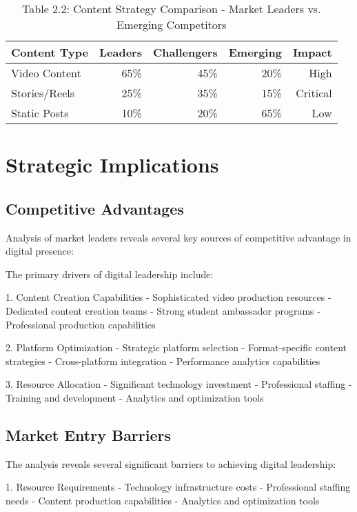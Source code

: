 \documentclass[12pt]{report}
\begin{document}
\begin{table}[h]
\centering
\caption{Table 2.2: Content Strategy Comparison - Market Leaders vs. Emerging Competitors}
\begin{tabular}{@{}lrrrr@{}}
\toprule
\textbf{Content Type} & \textbf{Leaders} & \textbf{Challengers} & \textbf{Emerging} & \textbf{Impact} \\
\midrule
Video Content & 65\% & 45\% & 20\% & High \\
Stories/Reels & 25\% & 35\% & 15\% & Critical \\
Static Posts & 10\% & 20\% & 65\% & Low \\
\bottomrule
\end{tabular}
\end{table}

\chapter{Strategic Implications}

\section{Competitive Advantages}

Analysis of market leaders reveals several key sources of competitive advantage in digital presence:

The primary drivers of digital leadership include:

1. Content Creation Capabilities
   - Sophisticated video production resources
   - Dedicated content creation teams
   - Strong student ambassador programs
   - Professional production capabilities

2. Platform Optimization
   - Strategic platform selection
   - Format-specific content strategies
   - Cross-platform integration
   - Performance analytics capabilities

3. Resource Allocation
   - Significant technology investment
   - Professional staffing
   - Training and development
   - Analytics and optimization tools

\section{Market Entry Barriers}

The analysis reveals several significant barriers to achieving digital leadership:

1. Resource Requirements
   - Technology infrastructure costs
   - Professional staffing needs
   - Content production capabilities
   - Analytics and optimization tools
\end{document}
